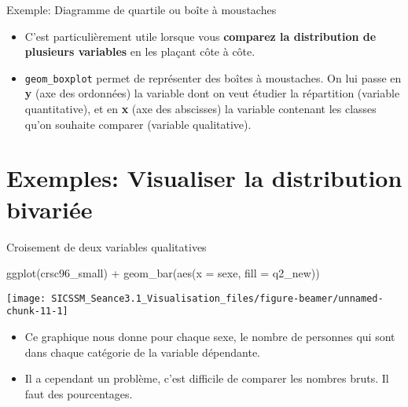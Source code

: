 \documentclass[
  ignorenonframetext,
]{beamer}
\newenvironment{Shaded}{\begin{snugshade}}{\end{snugshade}}
\newcommand{\AttributeTok}[1]{\textcolor[rgb]{0.77,0.63,0.00}{#1}}
\newcommand{\FunctionTok}[1]{\textcolor[rgb]{0.00,0.00,0.00}{#1}}
\newcommand{\NormalTok}[1]{#1}
\newcommand{\SpecialCharTok}[1]{\textcolor[rgb]{0.00,0.00,0.00}{#1}}
\providecommand{\tightlist}{%
  \setlength{\itemsep}{0pt}\setlength{\parskip}{0pt}}
\begin{document}
\begin{frame}[fragile]{Exemple: Diagramme de quartile ou boîte à
moustaches}
\protect\hypertarget{exemple-diagramme-de-quartile-ou-bouxeete-uxe0-moustaches}{}
\begin{itemize}
\item
  C'est particulièrement utile lorsque vous \textbf{comparez la
  distribution de plusieurs variables} en les plaçant côte à côte.
\item
  \texttt{geom\_boxplot} permet de représenter des boîtes à moustaches.
  On lui passe en \textbf{y} (axe des ordonnées) la variable dont on
  veut étudier la répartition (variable quantitative), et en \textbf{x}
  (axe des abscisses) la variable contenant les classes qu'on souhaite
  comparer (variable qualitative).
\end{itemize}
\end{frame}

\hypertarget{exemples-visualiser-la-distribution-bivariuxe9e}{%
\section{Exemples: Visualiser la distribution
bivariée}\label{exemples-visualiser-la-distribution-bivariuxe9e}}

\begin{frame}[fragile]{Croisement de deux variables qualitatives}
\protect\hypertarget{croisement-de-deux-variables-qualitatives}{}
\begin{Shaded}
\begin{Highlighting}[]
\FunctionTok{ggplot}\NormalTok{(crsc96\_small) }\SpecialCharTok{+}
  \FunctionTok{geom\_bar}\NormalTok{(}\FunctionTok{aes}\NormalTok{(}\AttributeTok{x =}\NormalTok{ sexe, }\AttributeTok{fill =}\NormalTok{ q2\_new))}
\end{Highlighting}
\end{Shaded}

\begin{center}\texttt{[image: SICSSM\_Seance3.1\_Visualisation\_files/figure-beamer/unnamed-chunk-11-1]} \end{center}

\begin{itemize}
\tightlist
\item
  Ce graphique nous donne pour chaque sexe, le nombre de personnes qui
  sont dans chaque catégorie de la variable dépendante.
\item
  Il a cependant un problème, c'est difficile de comparer les nombres
  bruts. Il faut des pourcentages.
\end{itemize}
\end{frame}
\end{document}
